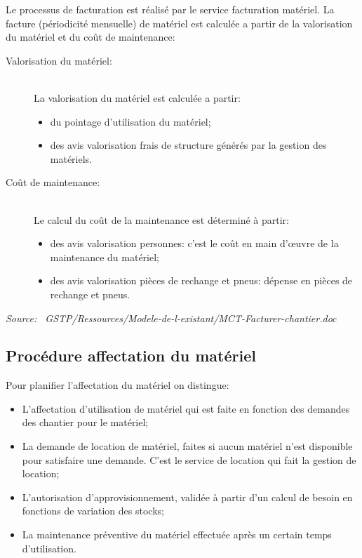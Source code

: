 	Le processus de facturation est réalisé par le service facturation
    matériel. La facture (périodicité mensuelle) de matériel est calculée a
    partir de la valorisation du matériel et du coût de maintenance:

    \begin{description}
	    \item [Valorisation du matériel:]\hfill\\
            La valorisation du matériel est calculée a partir:
		    \begin{itemize}
			    \item du pointage d'utilisation du matériel;
			    \item des avis valorisation frais de structure générés par
                    la gestion des matériels.
		    \end{itemize}	
    
    	\item [Coût de maintenance:]\hfill\\
    		Le calcul du coût de la maintenance est déterminé à partir:
		    \begin{itemize}
			    \item des avis valorisation personnes: c'est le coût en
                    main d'\oe{}uvre de la maintenance du matériel;
			    \item des avis valorisation pièces de rechange et pneus:
                    dépense en pièces de rechange et pneus.
		    \end{itemize}

    \end{description}

    {\sl Source:~{\ttfamily 
        GSTP/Ressources/Modele-de-l-existant/MCT-Facturer-chantier.doc}}

\subsection{Procédure affectation du matériel}

	Pour planifier l'affectation du matériel on distingue:
	\begin{itemize}
		\item L'affectation d'utilisation de matériel qui est faite en
            fonction des demandes des chantier pour le matériel;
		\item La demande de location de matériel, faites si aucun matériel
            n'est disponible pour satisfaire une demande. C'est le service de
            location qui fait la gestion de location;
		\item L'autorisation d'approvisionnement, validée à partir d'un
            calcul de besoin en fonctions de variation des stocks;
		\item La maintenance préventive du matériel effectuée après un
            certain temps d'utilisation.
	\end{itemize}

